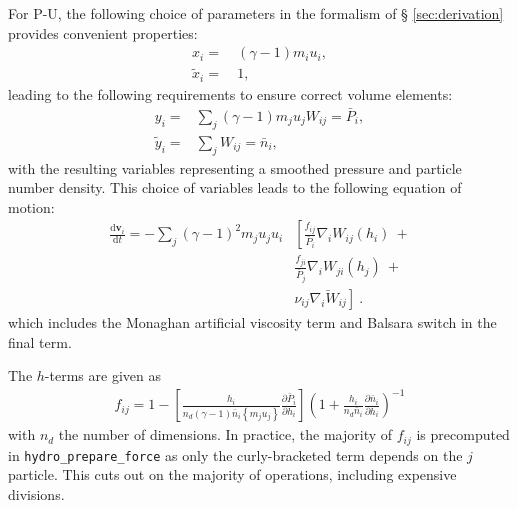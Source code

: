 For P-U, the following choice of parameters in the formalism of \S
\ref{sec:derivation} provides convenient properties:
\begin{align}
  x_i =&~ (\gamma - 1) m_i u_i, \\
  \tilde{x}_i =&~ 1,
  \label{eq:sph:pu:xichoice}
\end{align}
leading to the following requirements to ensure correct volume elements:
\begin{align}
  y_i =& \sum_{j} (\gamma - 1) m_j u_j W_{ij} = \bar{P}_i,\\
  \tilde{y}_i =& \sum_{j} W_{ij} = \bar{n}_i,
  \label{eq:sph:pu:yichoice}
\end{align}
with the resulting variables representing a smoothed pressure and particle
number density. This choice of variables leads to the following equation of
motion:
\begin{align}
  \frac{\mathrm{d} \mathbf{v}_i}{\mathrm{d} t} = -\sum_j (\gamma - 1)^2 m_j u_j
u_i
	 &\left[\frac{f_{ij}}{\bar{P}_i} \nabla_i W_{ij}(h_i) ~+ \right. \nonumber \\
	       &\frac{f_{ji}}{\bar{P}_j} \nabla_i W_{ji}(h_j) ~+ \nonumber \\
	       & \left.\nu_{ij}\bar{\nabla_i W_{ij}}\right]~.
  \label{eq:sph:pu:eom}
\end{align}
which includes the Monaghan artificial viscosity term and Balsara switch in
the final term.

The $h$-terms are given as
\begin{align}
  f_{ij} = 1 - \left[\frac{h_i}{n_d (\gamma - 1) \bar{n}_i \left\{m_j
u_j\right\}}
		   \frac{\partial \bar{P}_i}{\partial h_i} \right]
		   \left( 1 + \frac{h_i}{n_d \bar{n}_i}
		   \frac{\partial \bar{n}_i}{\partial h_i} \right)^{-1}
  \label{eq:sph:pu:fij}
\end{align}
with $n_d$ the number of dimensions. In practice, the majority of $f_{ij}$ is
precomputed in {\tt hydro\_prepare\_force} as only the curly-bracketed term
depends on the $j$ particle. This cuts out on the majority of operations,
including expensive divisions.

